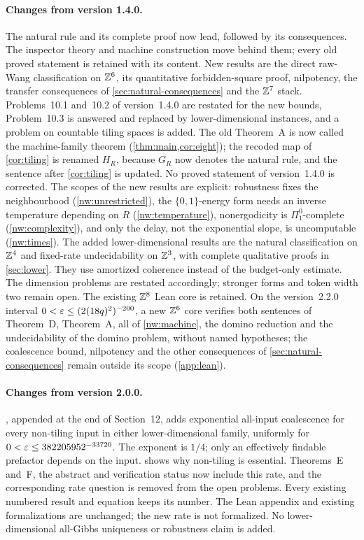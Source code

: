 \paragraph{Changes from version 1.4.0.}
The natural rule and its complete proof now lead, followed by its consequences. The inspector theory and machine construction move behind them; every old proved statement is retained with its content. New results are the direct raw-Wang classification on $\mathbb{Z}^6$, its quantitative forbidden-square proof, nilpotency, the transfer consequences of \cref{sec:natural-consequences} and the $\mathbb{Z}^7$ stack. Problems~10.1 and~10.2 of version~1.4.0 are restated for the new bounds, Problem~10.3 is answered and replaced by lower-dimensional instances, and a problem on countable tiling spaces is added. The old Theorem~A is now called the machine-family theorem (\cref{thm:main,cor:eight}); the recoded map of \cref{cor:tiling} is renamed $H_R$, because $G_R$ now denotes the natural rule, and the sentence after \cref{cor:tiling} is updated. No proved statement of version~1.4.0 is corrected. The scopes of the new results are explicit: robustness fixes the neighbourhood (\cref{nw:unrestricted}), the $\{0,1\}$-energy form needs an inverse temperature depending on $R$ (\cref{nw:temperature}), nonergodicity is $\Pi^0_1$-complete (\cref{nw:complexity}), and only the delay, not the exponential slope, is uncomputable (\cref{nw:times}). The added lower-dimensional results are the natural classification on $\mathbb{Z}^4$ and fixed-rate undecidability on $\mathbb{Z}^3$, with complete qualitative proofs in \cref{sec:lower}. They use amortized coherence instead of the budget-only estimate. The dimension problems are restated accordingly; stronger forms and token width two remain open. The existing $\mathbb{Z}^8$ Lean core is retained. On the version~2.2.0 interval $0<\varepsilon\le(2(18q)^2)^{-200}$, a new $\mathbb{Z}^6$ core verifies both sentences of Theorem~D, Theorem~A, all of \cref{nw:machine}, the domino reduction and the undecidability of the domino problem, without named hypotheses; the coalescence bound, nilpotency and the other consequences of \cref{sec:natural-consequences} remain outside its scope (\cref{app:lean}).

\paragraph{Changes from version 2.0.0.}
, appended at the end of Section~12, adds exponential all-input coalescence for every non-tiling input in either lower-dimensional family, uniformly for $0<\varepsilon\le382205952^{-33720}$. The exponent is $1/4$; only an effectively findable prefactor depends on the input.  shows why non-tiling is essential. Theorems~E and~F, the abstract and verification status now include this rate, and the corresponding rate question is removed from the open problems. Every existing numbered result and equation keeps its number. The Lean appendix and existing formalizations are unchanged; the new rate is not formalized. No lower-dimensional all-Gibbs uniqueness or robustness claim is added.

